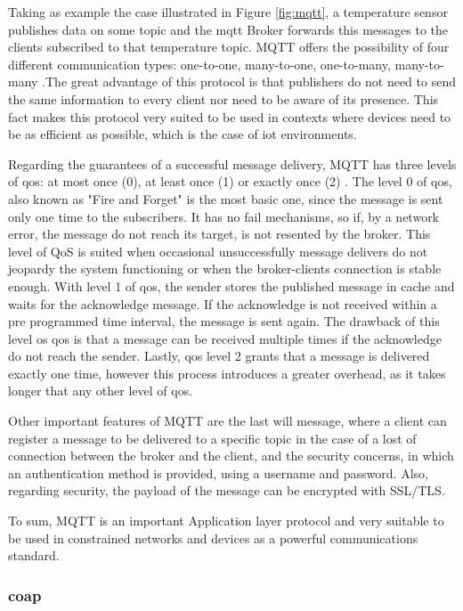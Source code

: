 Taking as example the case illustrated in Figure \ref{fig:mqtt}, a temperature sensor publishes data on some topic and the \ac{mqtt} Broker forwards this messages to the clients subscribed to that temperature topic. MQTT offers the possibility of four different communication types: one-to-one,  many-to-one, one-to-many, many-to-many \cite{Chen2016}.The great advantage of this protocol is that publishers do not need to send the same information to every client nor need to be aware of its presence. This fact makes this protocol very suited to be used in contexts where devices need to be as efficient as possible, which is the case of \ac{iot} environments. 

Regarding the guarantees of a successful message delivery, MQTT has three levels of \acf{qos}: at most once (0), at least once (1) or exactly once (2) \cite{mqtt_qos}. The level 0 of \ac{qos}, also known as "Fire and Forget" is the most basic one, since the message is sent only one time to the subscribers. It has no fail mechanisms, so if, by a network error, the message do not reach its target, is not resented by the broker. This level of QoS is suited when occasional unsuccessfully message delivers do not jeopardy the system functioning or when the broker-clients connection is stable enough. With level 1 of \ac{qos}, the sender stores the published message in cache and waits for the acknowledge message. If the acknowledge is not received within a pre programmed time interval, the message is sent again. The drawback of this level os \ac{qos} is that a message can be received multiple times if the acknowledge do not reach the sender. Lastly, \ac{qos} level 2 grants that a message is delivered exactly one time, however this process introduces a greater overhead, as it takes longer that any other level of \ac{qos}.

Other important features of MQTT are the last will message, where a client can register a message to be delivered to a specific topic in the case of a lost of connection between the broker and the client, and the security concerns, in which an authentication method is provided, using a username and password. Also, regarding security, the payload of the message can be encrypted with SSL/TLS.

To sum, MQTT is an important Application layer protocol and very suitable to be used in constrained networks and devices as a powerful communications standard.

\subsubsection{\acf{coap}}

